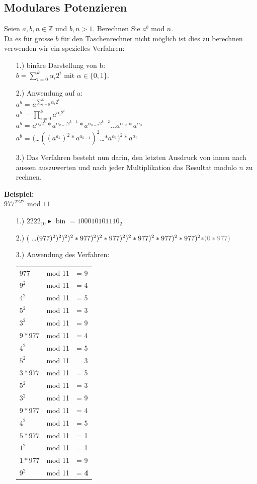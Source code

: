 \documentclass[landscape,twocolumn,a4paper]{article}
\newcommand{\ZN}{\mathbb{Z}} %
\begin{document}
\subsection{Modulares Potenzieren}
Seien $a,b,n \in \ZN$ und $b,n > 1$. Berechnen Sie $a^b$ mod $n$. \\
Da es für grosse $b$ für den Taschenrechner nicht möglich ist dies zu berechnen verwenden wir ein spezielles Verfahren:
\begin{itemize}
	\item[1.)] binäre Darstellung von b: \\
		$b=\sum_{i=0}^k \alpha_i2^i$ mit $\alpha \in \{0,1\}$.
	\item[2.)] Anwendung auf a: \\
		$a^b$ = $a^{\sum_{i=0}^k \alpha_i2^i}$\\
		$a^b$ = $\prod_{i=0}^{k} a^{\alpha_i2^i}$ \\
		$a^b$ = $a^{\alpha_k2^k}*a^{\alpha_{k-1}2^{k-1}}*a^{\alpha_{k-2}2^{k-2}} \dots  a^{\alpha_12}*a^{\alpha_0}$ \\
		$a^b$ = $($\dots$((a^{a_k})^2*a^{a_{k-1}})^2$\dots$*a^{\alpha_1})^2*a^{\alpha_0}$
	\item[3.)] Das Verfahren besteht nun darin, den letzten Ausdruck von innen nach aussen auszuwerten und nach jeder Multiplikation das Resultat modulo $n$ zu rechnen.
\end{itemize}
\textbf{Beispiel:} \\
$977^{2222}$ mod $11$
\begin{itemize}
	\item[1.)] $2222_{10} \blacktriangleright$ bin $= 100010101110_2$
	\item[2.)] ( \dots $ (977)^2)^2)^2)^2*977)^2)^2*977)^2)^2*977)^2*977)^2*977)^2 {\color{gray} *(0*977)}$
	\item[3.)] Anwendung des Verfahren: \\
	\begin{tabular}{l l l}
	 977 & mod 11 & = 9 \\
	 $9^2$ & mod 11 & = 4 \\
	 $4^2$ & mod 11 & = 5 \\
	 $5^2$ & mod 11 & = 3 \\
	 $3^2$ & mod 11 & = 9 \\
	 $9*977$ & mod 11 & = 4\\
	 $4^2$ & mod 11 & = 5\\
	 $5^2$ & mod 11 & = 3\\
	 $3*977$ & mod 11 & = 5\\
	 $5^2$ & mod 11 & = 3\\
	 $3^2$ & mod 11 & = 9\\
	 $9*977$ & mod 11 & = 4\\
	 $4^2$ & mod 11 & = 5\\
	 $5*977$ & mod 11 & = 1\\
	 $1^2$ & mod 11 & = 1\\
	 $1*977$ & mod 11 & = 9\\
	 $9^2$ & mod 11 & = \textbf{4}
	\end{tabular}
\end{itemize}
\end{document}
